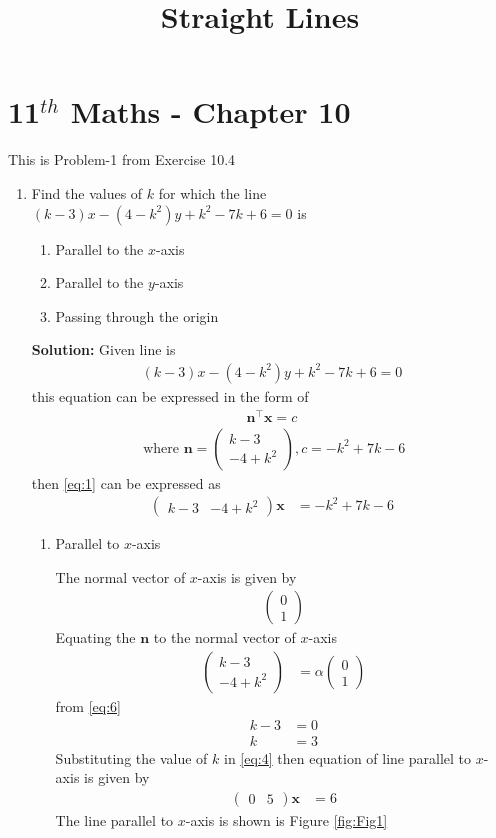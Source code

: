\documentclass[12pt]{article}
\newcommand{\solution}{\noindent \textbf{Solution: }}
\newcommand{\myvec}[1]{\ensuremath{\begin{pmatrix}#1\end{pmatrix}}}
\let\vec\mathbf
\begin{document}
\begin{center}
\enlargethispage{-4cm}
\title{\textbf{Straight Lines}}
\date{\vspace{-5ex}} %
\maketitle
\end{center}
\setcounter{page}{1}
\section*{11$^{th}$ Maths - Chapter 10}
This is Problem-1 from Exercise 10.4
\begin{enumerate}
\item Find the values of $k$ for which the line $(k-3)x-(4-k^2)y+k^2-7k+6=0$ is
\begin{enumerate}
\item Parallel to the $x$-axis
\item Parallel to the $y$-axis
\item Passing through the origin
\end{enumerate}

\solution
Given line is
\begin{align}
(k-3)x-(4-k^2)y+k^2-7k+6=0 \label{eq:1}
\end{align}
this equation can be expressed in the form of 
\begin{align}
\vec{n}^{\top}\vec{x}=c \label{eq:2}
\end{align}
\begin{align}
\text{ where }
\vec{n} = \myvec{k-3\\-4+k^2} , c  = -k^2+7k-6
\end{align}
then \eqref{eq:1} can be expressed as
\begin{align}
\myvec{k-3 & -4+k^2}\vec{x} &=-k^2+7k-6\label{eq:4}
\end{align}
\begin{enumerate}
    \item Parallel to $x$-axis
    
The normal vector of $x$-axis is given by
\begin{align}
\myvec{0\\1}
\end{align}
Equating the $\vec{n}$ to the normal vector of $x$-axis
\begin{align}
\myvec{k-3\\-4+k^2} &=\alpha\myvec{0\\1}\label{eq:6}
\end{align}
from \eqref{eq:6}
\begin{align}
k-3& =0\\
k &=3
\end{align}
Substituting the value of $k$ in \eqref{eq:4} then equation of line parallel to $x$-axis is given by
\begin{align}
        \myvec{0 & 5}\vec{x} &=6
\end{align}
The line parallel to $x$-axis is shown is Figure \eqref{fig:Fig1}


\end{enumerate}
\end{enumerate}
\end{document}
